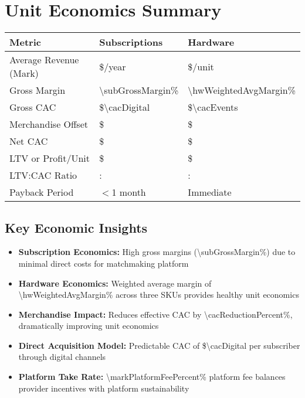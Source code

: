 
\section{Unit Economics Summary}

\begin{table}[H]
\centering
\begin{tabularx}{\linewidth}{l Y Y}
\toprule
Metric & Subscriptions & Hardware \\\midrule
Average Revenue (Mark) & \$\numint{\markWeightedAvgAnnual}/year & \$\numint{\hwWeightedAvgPrice}/unit \\
Gross Margin\cite{openview2023} & \num{\subGrossMargin}\% & \num{\hwWeightedAvgMargin}\% \\
Gross CAC & \$\num{\cacDigital} & \$\num{\cacEvents} \\
Merchandise Offset & \$\numfpeval{\merchOffsetSubsCalc} & \$\numfpeval{\merchOffsetHwCalc} \\
Net CAC & \$\numint{\cacDigital - \merchOffsetSubsCalc} & \$\numint{\cacEvents - \merchOffsetHwCalc} \\
LTV or Profit/Unit & \$\numint{\subLTV} & \$\numint{\hwWeightedAvgGP} \\
LTV:CAC Ratio & \numint{\subLTV/(\cacDigital - \merchOffsetSubsCalc)}: & \numint{\hwWeightedAvgGP/(\cacEvents - \merchOffsetHwCalc)}: \\
Payback Period & $<$\num{1} month & Immediate \\
\bottomrule
\end{tabularx}
\end{table}

\subsection{Key Economic Insights}
\begin{itemize}
    \item \textbf{Subscription Economics:} High gross margins (\num{\subGrossMargin}\%) due to minimal direct costs for matchmaking platform
    \item \textbf{Hardware Economics:} Weighted average margin of \num{\hwWeightedAvgMargin}\% across three SKUs provides healthy unit economics
    \item \textbf{Merchandise Impact:} Reduces effective CAC by \num{\cacReductionPercent}\%, dramatically improving unit economics
    \item \textbf{Direct Acquisition Model:} Predictable CAC of \$\num{\cacDigital} per subscriber through digital channels
    \item \textbf{Platform Take Rate:} \num{\markPlatformFeePercent}\% platform fee balances provider incentives with platform sustainability
\end{itemize}

